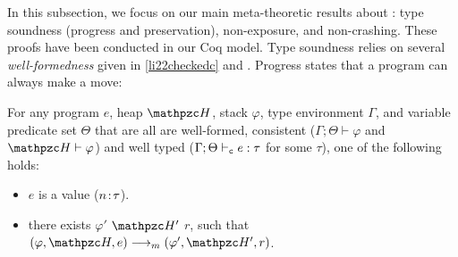 %     
%  
%  
%  
%  


In this subsection, we focus on our main meta-theoretic results about
\lang: type soundness (progress and preservation),
non-exposure, and non-crashing.
These proofs have been conducted in our Coq model.
Type soundness relies on several \emph{well-formedness} given in \ref{li22checkedc} and .
Progress states that a \lang program can always make a move:

\begin{thm}[Progress]\label{thm:progress}

For any \lang program $e$, heap $\heap$, stack
$\varphi$, type environment $\Gamma$, and variable predicate set $\Theta$
that are all are well-formed, consistent
($\Gamma;\Theta\vdash \varphi$ and $\heap \vdash \varphi$) and well
typed ($\Gamma;\Theta\vdash_{\texttt{c}} e : \tau$ for some $\tau$),
one of the following holds:

\begin{itemize}

\item $e$ is a value (${n}\!:\!{\tau}$).

\item there exists $\varphi'$ $\heap'$ $r$, such that $(\varphi,\heap,e) \longrightarrow_m (\varphi',\heap',r)$.

\end{itemize}
\end{thm}

